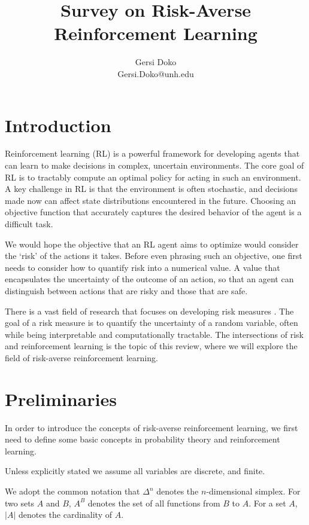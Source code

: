 \documentclass[10pt]{article}
\title{Survey on Risk-Averse Reinforcement Learning}
\author{Gersi Doko \\
        Gersi.Doko@unh.edu \\}
\theoremstyle{plain}
\theoremstyle{remark}
\begin{document}
\maketitle

\section{Introduction}

Reinforcement learning (RL) is a powerful framework for developing agents that can learn to make decisions in complex, uncertain environments.
The core goal of RL is to tractably compute an optimal policy for acting in such an environment. A key challenge in RL is 
that the environment is often stochastic, and decisions made now can affect state distributions encountered in the
future. Choosing an objective function that accurately captures the desired behavior of the agent is a difficult task.

We would hope the objective that an RL agent aims to optimize would consider the `risk' of the actions it takes. Before even phrasing such an objective, one first needs to consider how to quantify risk into a numerical value. A value that encapsulates the uncertainty of the outcome of an action,
so that an agent can distinguish between actions that are risky and those that are safe.

There is a vast field of research that focuses on developing risk measures . The goal of a risk measure is to quantify the uncertainty of a random variable, often while being interpretable and computationally tractable. The intersections of risk and reinforcement learning is the topic of this review, where we will explore the field of risk-averse reinforcement learning.

\section{Preliminaries}

In order to introduce the concepts of risk-averse reinforcement learning, we first need to define some basic concepts in probability theory and reinforcement learning.

Unless explicitly stated we assume all variables are discrete, and finite.

We adopt the common notation that $\Delta^n$ denotes the $n$-dimensional simplex. For two sets $A$ and $B$, $A^B$ denotes the set of all functions from $B$ to $A$. For a set $A$, $|A|$ denotes the cardinality of $A$.
\end{document}
